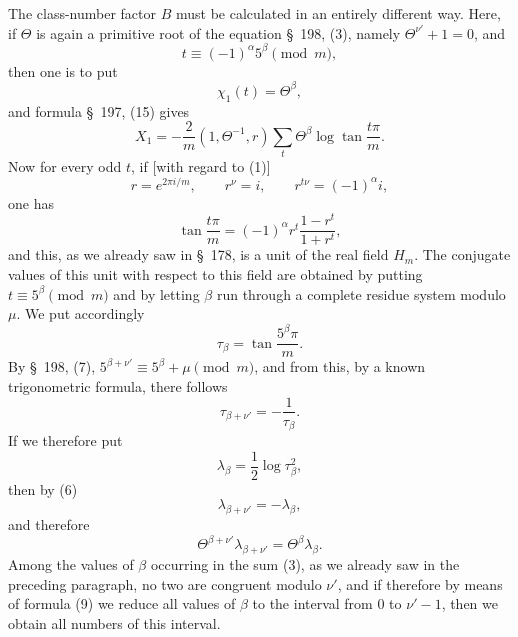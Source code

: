 \documentclass[11pt]{article}
\begin{document}
The class-number factor $B$ must be calculated in an entirely different way. Here, if $\Theta$ is again a primitive root of the equation \S~198, (3), namely $\Theta^{\nu'}+1=0$, and
\begin{equation}
t\equiv(-1)^\alpha5^\beta\pmod m,
\tag{1}
\end{equation}
then one is to put
\begin{equation}
\chi_1(t)=\Theta^\beta,
\tag{2}
\end{equation}
and formula \S~197, (15) gives
\begin{equation}
X_1=-\frac2m(1,\Theta^{-1},r)\sum_t\Theta^\beta\log\tan\frac{t\pi}{m}.
\tag{3}
\end{equation}
Now for every odd $t$, if [with regard to (1)]
\[
r=e^{2\pi i/m},
\qquad
r^\nu=i,
\qquad
r^{t\nu}=(-1)^\alpha i,
\]
one has
\begin{equation}
\tan\frac{t\pi}{m}=(-1)^\alpha r^t\frac{1-r^t}{1+r^t},
\tag{4}
\end{equation}
and this, as we already saw in \S~178, is a unit of the real field $H_m$. The conjugate values of this unit with respect to this field are obtained by putting $t\equiv5^\beta\pmod m$ and by letting $\beta$ run through a complete residue system modulo $\mu$. We put accordingly
\begin{equation}
\tau_\beta=\tan\frac{5^\beta\pi}{m}.
\tag{5}
\end{equation}
By \S~198, (7), $5^{\beta+\nu'}\equiv5^\beta+\mu\pmod m$, and from this, by a known trigonometric formula, there follows
\begin{equation}
\tau_{\beta+\nu'}=-\frac1{\tau_\beta}.
\tag{6}
\end{equation}
If we therefore put
\begin{equation}
\lambda_\beta=\frac12\log\tau_\beta^2,
\tag{7}
\end{equation}
then by (6)
\begin{equation}
\lambda_{\beta+\nu'}=-\lambda_\beta,
\tag{8}
\end{equation}
and therefore
\begin{equation}
\Theta^{\beta+\nu'}\lambda_{\beta+\nu'}=\Theta^\beta\lambda_\beta.
\tag{9}
\end{equation}
Among the values of $\beta$ occurring in the sum (3), as we already saw in the preceding paragraph, no two are congruent modulo $\nu'$, and if therefore by means of
formula (9) we reduce all values of $\beta$ to the interval from $0$ to $\nu'-1$, then we obtain all numbers of this interval.
\end{document}
